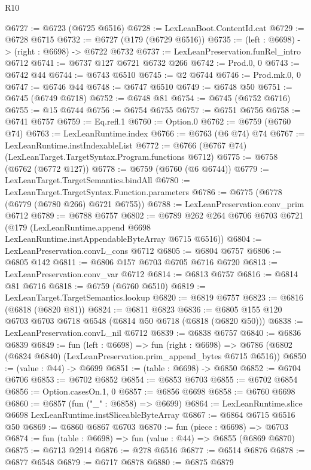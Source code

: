 \begin{lexlean}{R10}
\begin{coremodule}
@6727 := @6723 (@6725 @6516)
@6728 := LexLeanBoot.ContentId.cat
@6729 := @6728 @6715
@6732 := @6727 (@179 (@6729 @6516))
@6735 := (left : @6698) -> (right : @6698) -> @6722 @6732
@6737 := LexLeanPreservation.funRel_intro @6712
@6741 := @6737 @127 @6721 @6732 @266
@6742 := Prod.{0, 0}
@6743 := @6742 @44
@6744 := @6743 @6510
@6745 := @2 @6744
@6746 := Prod.mk.{0, 0}
@6747 := @6746 @44
@6748 := @6747 @6510
@6749 := @6748 @50
@6751 := @6745 (@6749 @6718)
@6752 := @6748 @81
@6754 := @6745 (@6752 @6716)
@6755 := @15 @6744
@6756 := @6754 @6755
@6757 := @6751 @6756
@6758 := @6741 @6757
@6759 := Eq.refl.{1}
@6760 := Option.{0}
@6762 := @6759 (@6760 @74)
@6763 := LexLeanRuntime.index
@6766 := @6763 (@6 @74) @74
@6767 := LexLeanRuntime.instIndexableList
@6772 := @6766 (@6767 @74) (LexLeanTarget.TargetSyntax.Program.functions @6712)
@6775 := @6758 (@6762 (@6772 @127))
@6778 := @6759 (@6760 (@6 @6744))
@6779 := LexLeanTarget.TargetSemantics.bindAll
@6780 := LexLeanTarget.TargetSyntax.Function.parameters
@6786 := @6775 (@6778 (@6779 (@6780 @266) @6721 @6755))
@6788 := LexLeanPreservation.conv_prim @6712
@6789 := @6788 @6757
@6802 := @6789
    @262
    @264
    @6706
    @6703
    @6721
    (@179 (LexLeanRuntime.append @6698 LexLeanRuntime.instAppendableByteArray @6715 @6516))
@6804 := LexLeanPreservation.convL_cons @6712
@6805 := @6804 @6757
@6806 := @6805 @142
@6811 := @6806 @157 @6703 @6705 @6716 @6720
@6813 := LexLeanPreservation.conv_var @6712
@6814 := @6813 @6757
@6816 := @6814 @81 @6716
@6818 := @6759 (@6760 @6510)
@6819 := LexLeanTarget.TargetSemantics.lookup
@6820 := @6819 @6757
@6823 := @6816 (@6818 (@6820 @81))
@6824 := @6811 @6823
@6836 := @6805 @155 @120 @6703 @6703 @6718 @6548 (@6814 @50 @6718 (@6818 (@6820 @50)))
@6838 := LexLeanPreservation.convL_nil @6712
@6839 := @6838 @6757
@6840 := @6836 @6839
@6849 := fun (left : @6698) =>
  fun (right : @6698) =>
  @6786 (@6802 (@6824 @6840) (LexLeanPreservation.prim_append_bytes @6715 @6516))
@6850 := (value : @44) -> @6699
@6851 := (table : @6698) -> @6850
@6852 := @6704 @6706
@6853 := @6702 @6852
@6854 := @6853 @6703
@6855 := @6702 @6854
@6856 := Option.casesOn.{1, 0}
@6857 := @6856 @6698
@6858 := @6760 @6698
@6860 := @6857 (fun ("_" : @6858) => @6699)
@6864 := LexLeanRuntime.slice @6698 LexLeanRuntime.instSliceableByteArray
@6867 := @6864 @6715 @6516 @50
@6869 := @6860 @6867 @6703
@6870 := fun (piece : @6698) => @6703
@6874 := fun (table : @6698) => fun (value : @44) => @6855 (@6869 @6870)
@6875 := @6713 @2914
@6876 := @278 @6516
@6877 := @6514 @6876
@6878 := @6877 @6548
@6879 := @6717 @6878
@6880 := @6875 @6879

\end{coremodule}
\end{lexlean}
